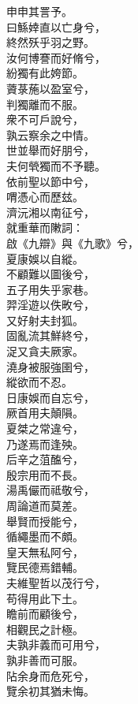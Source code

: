 \begin{pinyinscope}
\begin{shici}
申申其詈予。\\
曰鯀婞直以亡身兮，\\
終然殀乎羽之野。\\
汝何博謇而好脩兮，\\
紛獨有此姱節。\\
薋菉葹以盈室兮，\\
判獨離而不服。\\
衆不可戶說兮，\\
孰云察余之中情。\\
世並舉而好朋兮，\\
夫何煢獨而不予聽。\\
依前聖以節中兮，\\
喟憑心而歷玆。\\
濟沅湘以南征兮，\\
就重華而敶詞：\\
啟《九辯》與《九歌》兮，\\
夏康娛以自縱。\\
不顧難以圖後兮，\\
五子用失乎家巷。\\
羿淫遊以佚畋兮，\\
又好射夫封狐。\\
固亂流其鮮終兮，\\
浞又貪夫厥家。\\
澆身被服強圉兮，\\
縱欲而不忍。\\
日康娛而自忘兮，\\
厥首用夫顛隕。\\
夏桀之常違兮，\\
乃遂焉而逢殃。\\
后辛之菹醢兮，\\
殷宗用而不長。\\
湯禹儼而祗敬兮，\\
周論道而莫差。\\
舉賢而授能兮，\\
循繩墨而不頗。\\
皇天無私阿兮，\\
覽民德焉錯輔。\\
夫維聖哲以茂行兮，\\
苟得用此下土。\\
瞻前而顧後兮，\\
相觀民之計極。\\
夫孰非義而可用兮，\\
孰非善而可服。\\
阽余身而危死兮，\\
覽余初其猶未悔。\\

\end{shici}
\end{pinyinscope}

